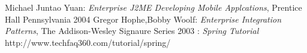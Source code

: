\begin{thebibliography}{99}
 Michael Juntao Yuan: \emph{Enterprise J2ME Developing Mobile
Applcations}, Prentice Hall Pennsylvania 2004
 Gregor Hophe,Bobby Woolf: \emph{Enterprise Integration
Patterns}, The Addison-Wesley Signaure Series 2003
: \emph{Spring Tutorial}
http://www.techfaq360.com/tutorial/spring/
\end{thebibliography}